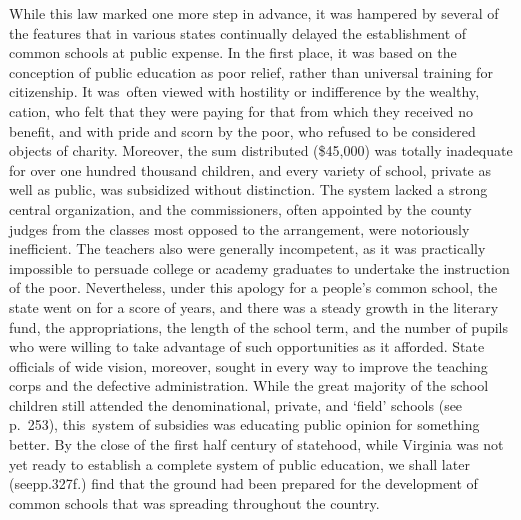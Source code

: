 \documentclass[]{book}
\begin{document}
While this law marked one more step in advance, it was hampered by several of the features that in various states continually delayed the establishment of common schools at public expense. In the first place, it was based on the conception of public education as poor relief, rather than universal training for citizenship. It was~often viewed with hostility or indifference by the wealthy, cation, who felt that they were paying for that from which they received no benefit, and with pride and scorn by the poor, who refused to be considered objects of charity. Moreover, the sum distributed (\$45,000) was totally inadequate for over one hundred thousand children, and every variety of school, private as well as public, was subsidized without distinction. The system lacked a strong central organization, and the commissioners, often appointed by the county judges from the classes most opposed to the arrangement, were notoriously inefficient. The teachers also were generally incompetent, as it was practically impossible to persuade college or academy graduates to undertake the instruction of the poor. Nevertheless, under this apology for a people's common school, the state went on for a score of years, and there was a steady growth in the literary fund, the appropriations, the length of the school term, and the number of pupils who were willing to take advantage of such opportunities as it afforded. State officials of wide vision, moreover, sought in every way to improve the teaching corps and the defective administration. While the great majority of the school children still attended the denominational, private, and `field' schools (see p.~253), this~system of subsidies was educating public opinion for something better. By the close of the first half century of statehood, while Virginia was not yet ready to establish a complete system of public education, we shall later (seepp.327f.) find that the ground had been prepared for the development of common schools that was spreading throughout the country.
\end{document}
